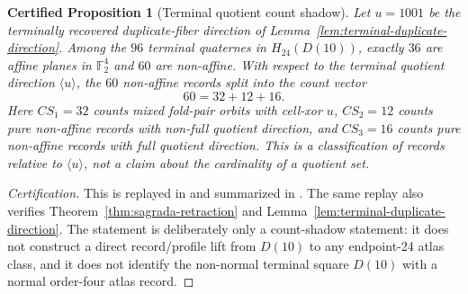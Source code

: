 \documentclass[11pt,a4paper]{article}
\newtheorem{certprop}[theorem]{Certified Proposition}
\theoremstyle{definition}
\theoremstyle{remark}
\newcommand{\F}{\mathbb F}
\begin{document}
\begin{certprop}[Terminal quotient count shadow]
\label{prop:terminal-count-shadow}
Let \(u=1001\) be the terminally recovered duplicate-fiber direction of
Lemma~\ref{lem:terminal-duplicate-direction}.  Among the \(96\) terminal
quaternes in \(H_{24}(D(10))\), exactly \(36\) are affine planes in
\(\F_2^4\) and \(60\) are non-affine.  With respect to the terminal quotient
direction \(\langle u\rangle\), the \(60\) non-affine records split into the
count vector
\[
  60=32+12+16.
\]
Here \(CS_1=32\) counts mixed fold-pair orbits with cell-xor \(u\),
\(CS_2=12\) counts pure non-affine records with non-full quotient direction,
and \(CS_3=16\) counts pure non-affine records with full quotient direction.
This is a classification of records relative to \(\langle u\rangle\), not a
claim about the cardinality of a quotient set.
\end{certprop}

\begin{proof}[Certification]
This is replayed in
 and summarized in
.
The same replay also verifies Theorem~\ref{thm:sagrada-retraction} and
Lemma~\ref{lem:terminal-duplicate-direction}.  The statement is deliberately
only a count-shadow statement: it does not construct a direct record/profile
lift from \(D(10)\) to any endpoint-24 atlas class, and it does not identify
the non-normal terminal square \(D(10)\) with a normal order-four atlas record.
\end{proof}
\end{document}
